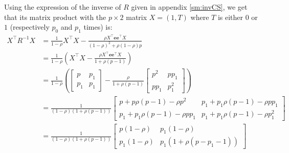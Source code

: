 \documentclass[12pt]{article}
\newcommand\Ve{\mathbf{e}}
\newcommand\trans[1]{{#1}^\intercal}%
\begin{document}
\bigskip

Using the expression of the inverse of \(R\) given in appendix
\ref{sm:invCS}, we get that its matrix product with the \(p \times 2\)
matrix \(X=(1,T)\) where \(T\) is either \(0\) or \(1\) (respectively
\(p_0\) and \(p_1\) times) is:
\begin{align*}
\trans{X} R^{-1} X &= \frac{1}{1-\rho} \trans{X}X - \frac{\rho\trans{X} \Ve\trans{\Ve} X}{(1-\rho)^2+\rho(1-\rho)p}  \\
&= \frac{1}{1-\rho} \left(\trans{X}X - \frac{\rho\trans{X} \Ve\trans{\Ve} X}{1 + \rho (p-1)}\right)  \\
&= \frac{1}{1-\rho} \left(\begin{bmatrix} p & p_1 \\ p_1 & p_1 \end{bmatrix} - \frac{\rho}{1+\rho(p-1)}  \begin{bmatrix} p^2 & p p_1 \\ p p_1 & p^2_1 \end{bmatrix}\right) \\
&= \frac{1}{(1-\rho)(1+\rho(p-1))} \begin{bmatrix} p+p\rho(p-1) - \rho p^2
                  & p_1+p_1\rho(p-1)- \rho p p_1
                  \\ p_1+p_1\rho(p-1)- \rho p p_1
                  & p_1+p_1\rho(p-1)- \rho p_1^2
\end{bmatrix}   \\
&= \frac{1}{(1-\rho)(1+\rho(p-1))} \begin{bmatrix} p(1-\rho)
                  & p_1(1-\rho)
                  \\ p_1(1-\rho)
                  & p_1(1+\rho (p-p_1-1))
\end{bmatrix}   
\end{align*}
\end{document}
